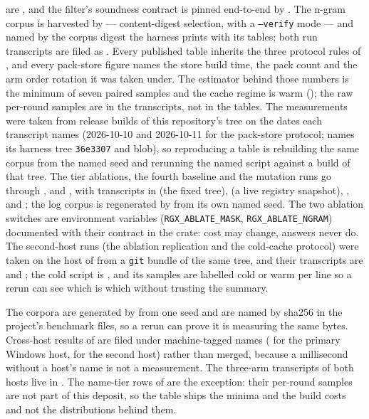 \documentclass[11pt,letterpaper]{article}
\begin{document}
are , and the filter's
soundness contract is pinned end-to-end by
.
The n-gram corpus is harvested by 
--- content-digest selection, with a \texttt{--verify} mode --- and named
by the corpus digest the harness prints with its tables; both run
transcripts are filed as .
Every published table
inherits the three protocol rules of , and every pack-store
figure names the store build time, the pack count and the arm order
rotation it was taken under. The estimator behind those numbers is the
minimum of seven paired samples and the cache regime is warm
(); the raw per-round samples are in the transcripts, not in
the tables. The measurements were taken from release builds of this
repository's tree on the dates each transcript names (2026-10-10 and
2026-10-11 for the pack-store protocol;  names its harness
tree \texttt{36e3307} and blob), so reproducing a table is rebuilding the
same corpus from the named seed and rerunning the named script against a
build of that tree. The tier ablations, the fourth baseline and the
mutation runs go through ,
 and , with
transcripts in  (the fixed tree),
 (a live registry snapshot),
,
 and
; the log corpus is regenerated
by  from its own named seed. The two
ablation switches are environment variables
(\texttt{RGX\_ABLATE\_MASK}, \texttt{RGX\_ABLATE\_NGRAM}) documented with
their contract in the crate: cost may change, answers never do. The
second-host runs (the ablation replication and the cold-cache protocol)
were taken on the host of  from a \texttt{git} bundle of
the same tree, and their transcripts are
 and
; the cold script is
, and its samples are labelled cold or warm per
line so a rerun can see which is which without trusting the summary.

The corpora are generated by  from one seed
and are named by sha256 in the project's benchmark files, so a rerun can
prove it is measuring the same bytes. Cross-host results of
 are filed under machine-tagged names
( for the primary Windows host,
 for the second host) rather
than merged, because a millisecond without a host's name is not a
measurement. The three-arm transcripts of both hosts live in
. The name-tier rows of
 are the exception: their per-round samples are not part of
this deposit, so the table ships the minima and the build costs and not the
distributions behind them.
\end{document}
